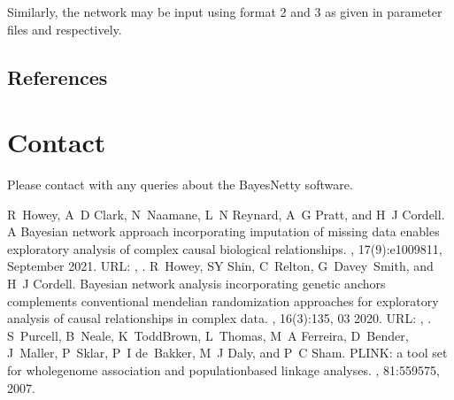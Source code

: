 \documentclass[letterpaper,10pt,english]{sphinxmanual}
\begin{document}
\sphinxAtStartPar
Similarly, the network may be input using format 2 and 3 as given in parameter files  and  respectively.

\sphinxstepscope


\section{References}
\label{\detokenize{references:references}}\label{\detokenize{references:id1}}\label{\detokenize{references::doc}}
\sphinxAtStartPar



\chapter{Contact}
\label{\detokenize{index:contact}}\label{\detokenize{index:id3}}
\sphinxAtStartPar
Please contact  with any queries about the BayesNetty software.

\begin{sphinxthebibliography}{1}
\sphinxAtStartPar
R Howey, A D Clark, N Naamane, L N Reynard, A G Pratt, and H J Cordell. A Bayesian network approach incorporating imputation of missing data enables exploratory analysis of complex causal biological relationships. , 17(9):e1009811, September 2021. URL: , .
\sphinxAtStartPar
R Howey, S\sphinxhyphen{}Y Shin, C Relton, G Davey Smith, and H J Cordell. Bayesian network analysis incorporating genetic anchors complements conventional mendelian randomization approaches for exploratory analysis of causal relationships in complex data. , 16(3):1\textendash{}35, 03 2020. URL: , .
\sphinxAtStartPar
S Purcell, B Neale, K Todd\sphinxhyphen{}Brown, L Thomas, M A Ferreira, D Bender, J Maller, P Sklar, P I de Bakker, M J Daly, and P C Sham. PLINK: a tool set for whole\sphinxhyphen{}genome association and population\sphinxhyphen{}based linkage analyses. , 81:559\textendash{}575, 2007.
\end{sphinxthebibliography}



\renewcommand{\indexname}{Index}
\printindex
\end{document}
